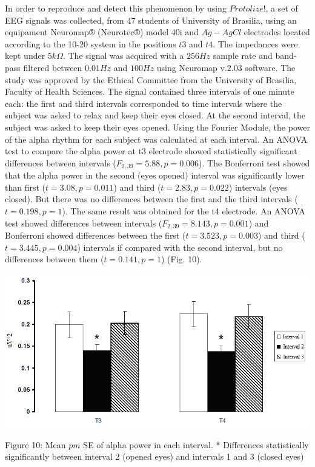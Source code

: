 \documentclass[12pt, a4paper]{article}
\begin{document}
In order to reproduce and detect this phenomenon by using $Protolize!$, a set of EEG signals was collected, from 47 students of University of Brasilia, using an equipament Neuromap® (Neurotec®) model 40i and $Ag-AgCl$ electrodes located according to the 10-20 system in the positions $t3$ and $t4$. The impedances were kept under $5k\Omega$. The signal was acquired with a $256 Hz$ sample rate and band-pass filtered between $0.01 Hz$ and $100 Hz$ using Neuromap v.2.03 software. The study was approved by the Ethical Committee from the University of Brasilia, Faculty of Health Sciences. The signal contained three intervals of one minute each: the first and third intervals corresponded to time intervals where the subject was asked to relax and keep their eyes closed. At the second interval, the subject was asked to keep their eyes opened. Using the Fourier Module, the power of the alpha rhythm for each subject was calculated at each interval.  An ANOVA test to compare the alpha power at t3 electrode showed statistically significant differences between intervals ($F_{2,39}=5.88, p=0.006$). The Bonferroni test showed that the alpha power in the second (eyes opened) interval was significantly lower than first ($t=3.08, p=0.011$) and third ($t=2.83, p=0.022$) intervals (eyes closed). But there was no differences between the first and the third intervals ($t=0.198, p=1$). The same result was obtained for the t4 electrode. An ANOVA test showed differences between intervals ($F_{2,39}=8.143, p=0.001$) and Bonferroni showed differences between the first  ($t=3.523, p=0.003$) and third ($t=3.445, p=0.004$) intervals if compared with the second interval, but no differences between them ($t=0.141, p=1$) (Fig. 10).
\begin{center}
\includegraphics{image009.png}

Figure 10: Mean $pm$ SE of alpha power in each interval. * Differences statistically significantly between interval 2 (opened eyes) and intervals 1 and 3 (closed eyes)
\end{center}
\end{document}
